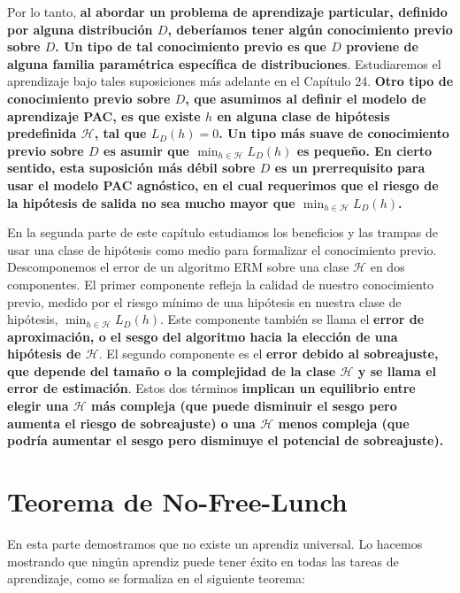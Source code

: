 Por lo tanto, \textbf{al abordar un problema de aprendizaje particular, definido por alguna distribución $D$, deberíamos tener algún conocimiento previo sobre $D$. Un tipo de tal conocimiento previo es que $D$ proviene de alguna familia paramétrica específica de distribuciones}. Estudiaremos el aprendizaje bajo tales suposiciones más adelante en el Capítulo 24. \textbf{Otro tipo de conocimiento previo sobre $D$, que asumimos al definir el modelo de aprendizaje PAC, es que existe $h$ en alguna clase de hipótesis predefinida $\mathcal{H}$, tal que $L_D(h) = 0$. Un tipo más suave de conocimiento previo sobre $D$ es asumir que $\min_{h \in \mathcal{H}} L_D(h)$ es pequeño. En cierto sentido, esta suposición más débil sobre $D$ es un prerrequisito para usar el modelo PAC agnóstico, en el cual requerimos que el riesgo de la hipótesis de salida no sea mucho mayor que $\min_{h \in \mathcal{H}} L_D(h)$.}

En la segunda parte de este capítulo estudiamos los beneficios y las trampas de usar una clase de hipótesis como medio para formalizar el conocimiento previo. Descomponemos el error de un algoritmo ERM sobre una clase $\mathcal{H}$ en dos componentes. El primer componente refleja la calidad de nuestro conocimiento previo, medido por el riesgo mínimo de una hipótesis en nuestra clase de hipótesis, $\min_{h \in \mathcal{H}} L_D(h)$. Este componente también se llama el \textbf{error de aproximación, o el sesgo del algoritmo hacia la elección de una hipótesis de $\mathcal{H}$}. El segundo componente es el \textbf{error debido al sobreajuste, que depende del tamaño o la complejidad de la clase $\mathcal{H}$ y se llama el error de estimación}. Estos dos términos \textbf{implican un equilibrio entre elegir una $\mathcal{H}$ más compleja (que puede disminuir el sesgo pero aumenta el riesgo de sobreajuste) o una $\mathcal{H}$ menos compleja (que podría aumentar el sesgo pero disminuye el potencial de sobreajuste).}

\section{Teorema de No-Free-Lunch}
En esta parte demostramos que no existe un aprendiz universal. Lo hacemos mostrando que ningún aprendiz puede tener éxito en todas las tareas de aprendizaje, como se formaliza en el siguiente teorema:

